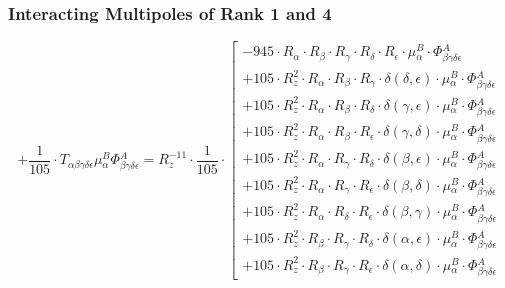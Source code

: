 \documentclass{article}
\begin{document}
\subsubsection*{Interacting Multipoles of Rank 1 and 4}
\begin{equation}
+ \frac{1}{105} \cdot T_{\alpha{}\beta{}\gamma{}\delta{}\epsilon{}} \mu{}^{B}_{\alpha{}} \Phi{}^{A}_{\beta{}\gamma{}\delta{}\epsilon{}} = R_{z}^{-11} \cdot \frac{1}{105} \cdot  \left[ \begin{array}{c} 
 		- 945 \cdot R_{\alpha{}} \cdot R_{\beta{}} \cdot R_{\gamma{}} \cdot R_{\delta{}} \cdot R_{\epsilon{}} \cdot \mu{}^{B}_{\alpha{}} \cdot \Phi{}^{A}_{\beta{}\gamma{}\delta{}\epsilon{}} 
 \\[0.2em] 		 + 105 \cdot R_{z}^{2} \cdot R_{\alpha{}} \cdot R_{\beta{}} \cdot R_{\gamma{}} \cdot \delta{}\left(\delta{}, \epsilon{}\right) \cdot \mu{}^{B}_{\alpha{}} \cdot \Phi{}^{A}_{\beta{}\gamma{}\delta{}\epsilon{}} 
 \\[0.2em] 		 + 105 \cdot R_{z}^{2} \cdot R_{\alpha{}} \cdot R_{\beta{}} \cdot R_{\delta{}} \cdot \delta{}\left(\gamma{}, \epsilon{}\right) \cdot \mu{}^{B}_{\alpha{}} \cdot \Phi{}^{A}_{\beta{}\gamma{}\delta{}\epsilon{}} 
 \\[0.2em] 		 + 105 \cdot R_{z}^{2} \cdot R_{\alpha{}} \cdot R_{\beta{}} \cdot R_{\epsilon{}} \cdot \delta{}\left(\gamma{}, \delta{}\right) \cdot \mu{}^{B}_{\alpha{}} \cdot \Phi{}^{A}_{\beta{}\gamma{}\delta{}\epsilon{}} 
 \\[0.2em] 		 + 105 \cdot R_{z}^{2} \cdot R_{\alpha{}} \cdot R_{\gamma{}} \cdot R_{\delta{}} \cdot \delta{}\left(\beta{}, \epsilon{}\right) \cdot \mu{}^{B}_{\alpha{}} \cdot \Phi{}^{A}_{\beta{}\gamma{}\delta{}\epsilon{}} 
 \\[0.2em] 		 + 105 \cdot R_{z}^{2} \cdot R_{\alpha{}} \cdot R_{\gamma{}} \cdot R_{\epsilon{}} \cdot \delta{}\left(\beta{}, \delta{}\right) \cdot \mu{}^{B}_{\alpha{}} \cdot \Phi{}^{A}_{\beta{}\gamma{}\delta{}\epsilon{}} 
 \\[0.2em] 		 + 105 \cdot R_{z}^{2} \cdot R_{\alpha{}} \cdot R_{\delta{}} \cdot R_{\epsilon{}} \cdot \delta{}\left(\beta{}, \gamma{}\right) \cdot \mu{}^{B}_{\alpha{}} \cdot \Phi{}^{A}_{\beta{}\gamma{}\delta{}\epsilon{}} 
 \\[0.2em] 		 + 105 \cdot R_{z}^{2} \cdot R_{\beta{}} \cdot R_{\gamma{}} \cdot R_{\delta{}} \cdot \delta{}\left(\alpha{}, \epsilon{}\right) \cdot \mu{}^{B}_{\alpha{}} \cdot \Phi{}^{A}_{\beta{}\gamma{}\delta{}\epsilon{}} 
 \\[0.2em] 		 + 105 \cdot R_{z}^{2} \cdot R_{\beta{}} \cdot R_{\gamma{}} \cdot R_{\epsilon{}} \cdot \delta{}\left(\alpha{}, \delta{}\right) \cdot \mu{}^{B}_{\alpha{}} \cdot \Phi{}^{A}_{\beta{}\gamma{}\delta{}\epsilon{}} 

\end{array}
\end{equation}
\end{document}

